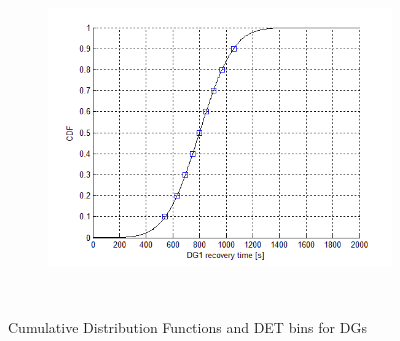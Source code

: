 \begin{figure}
        \centering %
        ~ %
        \begin{subfigure}[b]{0.48\textwidth}
                \centering
                \includegraphics[width=\textwidth]{figures/DG1Dist.png}
                \caption{}
                \label{fig:DG1Dist}
        \end{subfigure}
        ~ %
        \caption{Cumulative Distribution Functions and DET bins  for DGs}\label{fig:CDFsDGs}
\end{figure}
